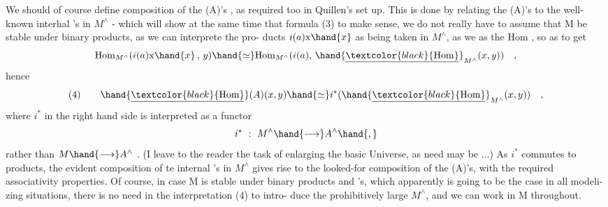 We should of course define composition of the \hand{\uline{\textcolor{black}{Hom}}}(A)'s ,  as required
too in Quillen's  set up.  This is done by relating the \hand{\uline{\textcolor{black}{Hom}}}(A)'s  to
the well-known interhal  \hand{\uline{\textcolor{black}{Hom}}}'s  in $M^{\wedge}$  -  which will show at the same
time that  formula (3) to make sense,  we do not really have to assume
that M be stable under binary products,  as we can interprete the pro-%
ducts  $i(a)\mathrm{x}\hand{x}$  as being taken in $M^{\wedge}$,  as we as the Hom ,  so as to
get
\[ \mathrm{Hom}_{M^{\wedge}}(i(a)\mathrm{x}\hand{x} \, , \, y) \hand{\simeq} \mathrm{Hom}_{M^{\wedge}}(i(a), \, \hand{\underline{\textcolor{black}{\mathrm{Hom}}}}_{M^{\wedge}}(x,y)) \quad , \]
hence
\[ (4) \qquad \hand{\underline{\textcolor{black}{\mathrm{Hom}}}}(A)(x,y) \hand{\simeq} i^{*}(\hand{\underline{\textcolor{black}{\mathrm{Hom}}}}_{M^{\wedge}}(x,y)) \quad , \]
where $i^{*}$  in the right hand side is interpreted as a functor
\[ i^{*} \ : \ M^{\wedge} \hand{\longrightarrow} A^{\wedge} \hand{,} \]
rather than $M \hand{\longrightarrow} A^{\wedge}$ .  (I leave to the reader the task of enlarging the
basic Universe,  as need may be ...)  As $i^{*}$ commutes to products,  the
evident composition of te internal \hand{\uline{\textcolor{black}{Hom}}}'s  in $M^{\wedge}$ gives rise to the
looked-for composition of the \hand{\uline{\textcolor{black}{Hom}}}(A)'s,  with the required associativity
properties.  Of course,  in case M is stable under binary products and
\hand{\uline{\textcolor{black}{Hom}}}'s,   which apparently is going to be the case in all modeli-%
zing situations,  there is no need in the interpretation (4) to intro-%
duce the prohibitively large $M^{\wedge}$,  and we can work in M throughout.

